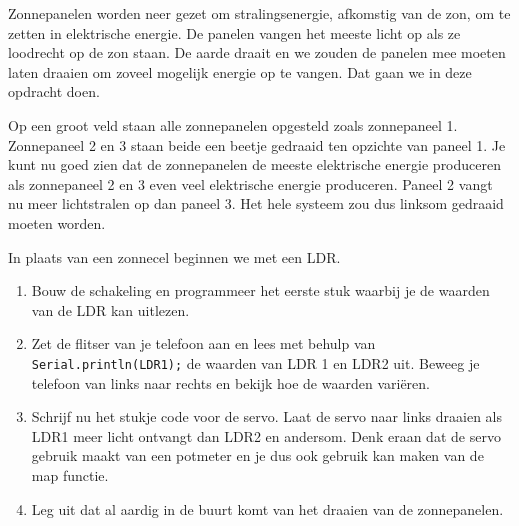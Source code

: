 \documentclass{arduino}
\begin{document}

Zonnepanelen worden neer gezet om stralingsenergie, afkomstig van de zon, om te zetten in elektrische energie. De panelen vangen het meeste licht op als ze loodrecht op de zon staan. De aarde draait en we zouden de panelen mee moeten laten draaien om zoveel mogelijk energie op te vangen. Dat gaan we in deze opdracht doen.

Op een groot veld staan alle zonnepanelen opgesteld zoals zonnepaneel 1. Zonnepaneel 2 en 3 staan beide een beetje gedraaid ten opzichte van paneel 1. Je kunt nu goed zien dat de zonnepanelen de meeste elektrische energie produceren als zonnepaneel 2 en 3 even veel elektrische energie produceren. Paneel 2 vangt nu meer lichtstralen op dan paneel 3. Het hele systeem zou dus linksom gedraaid moeten worden.

\newpage

In plaats van een zonnecel beginnen we met een LDR.

\begin{enumerate}[label={\alph*})]
\item Bouw de schakeling en programmeer het eerste stuk waarbij je de waarden van de LDR kan uitlezen.

\item Zet de flitser van je telefoon aan en lees met behulp van \lstinline{Serial.println(LDR1);} de waarden van LDR 1 en LDR2 uit. Beweeg je telefoon van links naar rechts en bekijk hoe de waarden variëren.

\item Schrijf nu het stukje code voor de servo. Laat de servo naar links draaien als LDR1 meer licht ontvangt dan LDR2 en andersom. Denk eraan dat de servo gebruik maakt van een potmeter en je dus ook gebruik kan maken van de map functie.

\item Leg uit dat al aardig in de buurt komt van het draaien van de zonnepanelen.
\end{enumerate}
\end{document}
